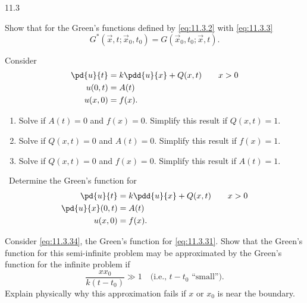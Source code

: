 \begin{exercises}{11.3}

\item \label{ex:11.3.1}
Show that for the Green's functions defined by \eqref{eq:11.3.2} with \eqref{eq:11.3.3}
\[
G^*(\vec{x},t;\vec{x}_0,t_0) = G(\vec{x}_0,t_0;\vec{x},t).
\]

\item \label{ex:11.3.2}
Consider
\begin{align*}
\pd{u}{t} &= k\pdd{u}{x} + Q(x,t) \qquad x > 0 \\
u(0,t) &= A(t) \\
u(x,0) &= f(x).
\end{align*}
\begin{enumerate}
\item[(a)] Solve if $A(t) = 0$ and $f(x) = 0$.  Simplify this result if $Q(x,t) = 1$.
\item[(b)] Solve if $Q(x,t) = 0$ and $A(t) = 0$.  Simplify this result if $f(x) = 1$.
\item[\starred (c)] Solve if $Q(x,t) = 0$ and $f(x) = 0$.  Simplify this result if $A(t) = 1$.
\end{enumerate}

\item \label{ex:11.3.3}
\starred\ Determine the Green's function for
\begin{align*}
\pd{u}{t} &= k\pdd{u}{x} + Q(x,t) \qquad x > 0 \\
\pd{u}{x}(0,t) &= A(t) \\
u(x,0) &= f(x).
\end{align*}

\item \label{ex:11.3.4}
Consider \eqref{eq:11.3.34}, the Green's function for \eqref{eq:11.3.31}.  Show that the Green's function for this semi-infinite problem may be approximated by the Green's function for the infinite problem if
\[
\frac{xx_0}{k(t-t_0)} \gg 1 \quad \text{(i.e., $t - t_0$ ``small'').}
\]
Explain physically why this approximation fails if $x$ or $x_0$ is near the boundary.


\end{exercises}
